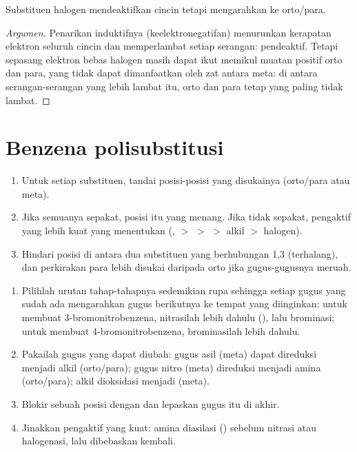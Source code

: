\begin{proposition}[Halogen]\label{prop:b2:aromatic-substitution:halogens}
Substituen halogen mendeaktifkan cincin tetapi mengarahkan ke orto/para.
\end{proposition}

\begin{proof}[Argumen]
Penarikan induktifnya (keelektronegatifan) menurunkan kerapatan elektron
seluruh cincin dan memperlambat setiap serangan: pendeaktif. Tetapi
sepasang elektron bebas halogen masih dapat ikut memikul muatan positif  orto dan para, yang tidak dapat dimanfaatkan oleh zat antara
meta: di antara serangan-serangan yang lebih lambat itu, orto dan para tetap
yang paling tidak lambat.
\end{proof}

\section{Benzena polisubstitusi}

\begin{method}\label{met:b2:aromatic-substitution:predict-position}
\begin{enumerate}
  \item Untuk setiap substituen, tandai posisi-posisi yang disukainya (orto/para atau meta).
  \item Jika semuanya sepakat, posisi itu yang menang. Jika tidak sepakat,
        pengaktif yang lebih kuat yang menentukan
        (,  $>$  $>$  $>$ alkil $>$ halogen).
  \item Hindari posisi di antara dua substituen yang berhubungan 1,3
        (terhalang), dan perkirakan para lebih disukai daripada orto jika
        gugus-gugusnya meruah.
\end{enumerate}
\end{method}

\begin{method}\label{met:b2:aromatic-substitution:plan-aromatic}
\begin{enumerate}
  \item Pilihlah urutan tahap-tahapnya sedemikian rupa sehingga setiap gugus
        yang sudah ada mengarahkan gugus berikutnya ke tempat yang
        diinginkan: untuk membuat 3-bromonitrobenzena, nitrasilah lebih
        dahulu (), lalu brominasi; untuk membuat
        4-bromonitrobenzena, brominasilah lebih dahulu.
  \item Pakailah gugus yang dapat diubah: gugus asil (meta) dapat direduksi
        menjadi alkil (orto/para); gugus nitro (meta) direduksi menjadi
        amina (orto/para); alkil dioksidasi menjadi
         (meta).
  \item Blokir sebuah posisi dengan  dan lepaskan gugus itu di akhir.
  \item Jinakkan pengaktif yang kuat: amina diasilasi () sebelum
        nitrasi atau halogenasi, lalu dibebaskan kembali.
\end{enumerate}
\end{method}

